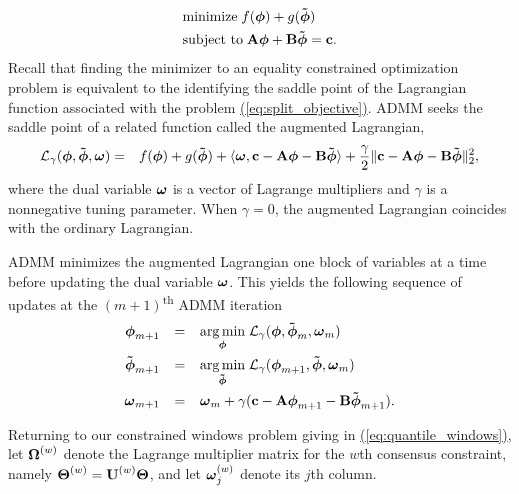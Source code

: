 \documentclass[aoas]{imsart}
\newcommand{\Eqn}[1]{\hyperref[eq:#1]{{\rm (\ref*{eq:#1})}}} %
\newcommand{\Eqn}[1]{{(\ref{eq:#1})}} %
\newcommand{\amp}{\mathop{\:\:\,}\nolimits}
\newcommand{\V}[1]{{\bm{\mathbf{\MakeLowercase{#1}}}}} %
\newcommand{\Vtilde}[1]{{\bm{\tilde \mathbf{\MakeLowercase{#1}}}}} %
\newcommand{\Vn}[2]{\V{#1}^{(#2)}} %
\newcommand{\M}[1]{{\bm{\mathbf{\MakeUppercase{#1}}}}} %
\newcommand{\Mn}[2]{\M{#1}^{(#2)}} %
\begin{document}
\begin{equation}
\label{eq:split_objective}
\begin{split}
&\text{minimize} \; f(\V{\phi}) + g(\Vtilde{\phi}) \\ 
&\text{subject to} \; \M{A}\V{\phi} + \M{B}\Vtilde{\phi} = \V{c}.
\end{split}
\end{equation}
Recall that finding the minimizer to an equality constrained optimization problem is equivalent to the identifying the saddle point of the Lagrangian function associated with the problem \Eqn{split_objective}. ADMM seeks the saddle point of a related function called the augmented Lagrangian,
\begin{eqnarray*}
	\mathcal{L}_{\gamma}(\V{\phi},\Vtilde{\phi},\V{\omega}) & = & f(\V{\phi}) + g(\Vtilde{\phi}) + \langle \V{\omega}, \V{c} - \M{A}\V{\phi} - \M{B}\Vtilde{\phi} \rangle
	+ \frac{\gamma}{2} \lVert \V{c} - \M{A}\V{\phi} - \M{B}\Vtilde{\phi} \rVert_2^2,
\end{eqnarray*}
where the dual variable $\V{\omega}$ is a vector of Lagrange multipliers and $\gamma$ is a nonnegative tuning parameter. When $\gamma = 0$, the augmented Lagrangian coincides with the ordinary Lagrangian.

ADMM minimizes the augmented Lagrangian one block of variables at a time before updating the dual variable $\V{\omega}$. This yields the following sequence of updates at the $(m+1)$\textsuperscript{th} ADMM iteration
\begin{equation}
\label{eq:admm_updates}
\begin{split}
\V{\phi}_{m+1} & \amp = \amp \underset{\V{\phi}}{\arg\min}\; \mathcal{L}_\gamma(\V{\phi},\Vtilde{\phi}_{m}, \V{\omega}_{m}) \\
\Vtilde{\phi}_{m+1} & \amp = \amp \underset{\Vtilde{\phi}}{\arg\min}\; \mathcal{L}_\gamma(\V{\phi}_{m+1},\Vtilde{\phi}, \V{\omega}_{m}) \\
\V{\omega}_{m+1} & \amp = \amp \V{\omega}_{m} + \gamma(\V{c} - \M{A}\V{\phi}_{m+1} - \M{B}\Vtilde{\phi}_{m+1}).
\end{split}
\end{equation}


Returning to our constrained windows problem giving in \Eqn{quantile_windows}, let $\Mn{\Omega}{w}$ denote the Lagrange multiplier matrix for the $w$th consensus constraint, namely $\Mn{\Theta}{w} = \Mn{U}{w}\M{\Theta}$, and let $\Vn{\omega}{w}_{j}$ denote its $j$th column.
\end{document}
